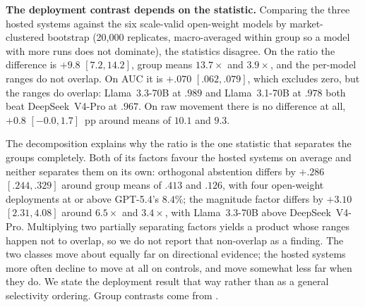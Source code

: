 \begin{center}
\begin{minipage}{\linewidth}
\centering
{}
\label{tab:exp1-abstention}
\scriptsize
\setlength{\tabcolsep}{4pt}
\resizebox{\linewidth}{!}{%

}
\end{minipage}
\end{center}

\textbf{The deployment contrast depends on the statistic.} Comparing the three
hosted systems against the six scale-valid open-weight models by market-clustered
bootstrap (20{,}000 replicates, macro-averaged within group so a model with more
runs does not dominate), the statistics disagree. On the ratio the
difference is $+9.8$ $[7.2,14.2]$, group means $13.7\times$ and $3.9\times$, and
the per-model ranges do not overlap. On AUC it is $+.070$ $[.062,.079]$, which
excludes zero, but the ranges do overlap: Llama~3.3-70B at $.989$ and
Llama~3.1-70B at $.978$ both beat DeepSeek~V4-Pro at $.967$. On raw movement there
is no difference at all, $+0.8$ $[-0.0,1.7]$~pp around means of $10.1$ and $9.3$.

The decomposition explains why the ratio is the one statistic that separates the
groups completely. Both of its factors favour the hosted systems on average and
neither separates them on its own: orthogonal abstention differs by $+.286$
$[.244,.329]$ around group means of $.413$ and $.126$, with four open-weight
deployments at or above GPT-5.4's $8.4\%$; the magnitude factor differs by
$+3.10$ $[2.31,4.08]$ around $6.5\times$ and $3.4\times$, with Llama~3.3-70B
above DeepSeek~V4-Pro. Multiplying two partially separating factors yields a
product whose ranges happen not to overlap, so we do not report that non-overlap
as a finding. The two classes move about equally far on directional evidence; the
hosted systems more often decline to move at all on controls, and move somewhat
less far when they do. We state the deployment result that way rather than as a
general selectivity ordering. Group contrasts come from
.

